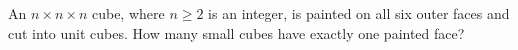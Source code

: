 An $n\times n\times n$ cube, where $n\ge2$ is an integer, is painted on all six outer faces and cut into unit cubes. How many small cubes have exactly one painted face?
